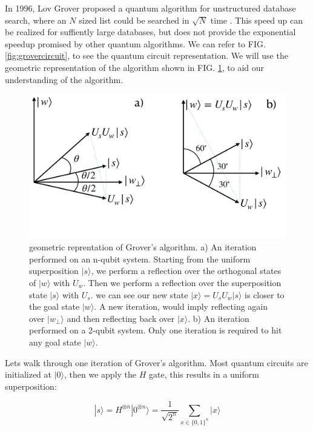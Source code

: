 \documentclass[twocolumn,showpacs,preprintnumbers,amsmath,amssymb]{revtex4}
\begin{document}
		In 1996, Lov Grover proposed a quantum algorithm for unstructured database search, where an $N$ sized list could be searched in $\sqrt{N}$ time \cite{grover1996fast}. This speed up can be realized for suffiently large databases, but does not provide the exponential speedup promised by other quantum algorithms. We can refer to FIG. \ref{fig:grovercircuit}, to see the quantum circuit representation. We will use the geometric representation of the algorithm shown in FIG. \ref{fig:grovergeometric}, to aid our understanding of the algorithm.  
		
		
		\begin{figure}[!h]
			\centering
			\includegraphics[trim={0 7.5cm 0 0},clip, width=0.99\linewidth]{"graphics/grov_geom"}
			\caption{geometric reprentation of Grover's algorithm.  a) An iteration performed on an n-qubit system.  Starting from the uniform superposition $|s\rangle$, we perform a reflection over the orthogonal states of $|w\rangle$ with $U_w$. Then we perform a reflection over the superposition state $|s\rangle$ with $U_s$. we can see our new state $|x\rangle = U_sU_w|s\rangle$ is closer to the goal state $|w\rangle$. A new iteration, would imply reflecting again over $|w_\perp\rangle$ and then reflecting back over $|x\rangle$. b) An iteration performed on a 2-qubit system. Only one iteration is required to hit any goal state $|w\rangle$. }
			\label{fig:grovergeometric}
		\end{figure}
		
		Lets walk through one iteration of Grover's algorithm. Most quantum circuits are initialized at $|0\rangle$, then we apply the $H$ gate, this results in a uniform superposition:
		
		\begin{equation}
		 |s\rangle = H^{\otimes n} |0^{\otimes n} \rangle = \frac{1}{\sqrt{2^n}} \sum_{x\in\{0,1\}^n} |x\rangle
		\end{equation}
		
\end{document}

